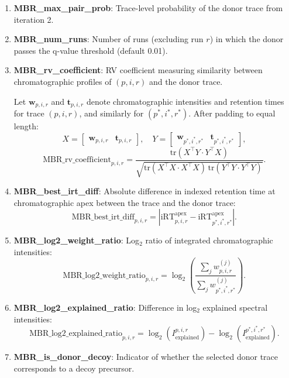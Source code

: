 \documentclass[pdflatex,sn-nature]{sn-jnl}
\begin{document}
\begin{enumerate}

\item \textbf{MBR\_max\_pair\_prob}:  
Trace-level probability of the donor trace from iteration 2.

\item \textbf{MBR\_num\_runs}:  
Number of runs (excluding run $r$) in which the donor passes the q-value threshold (default 0.01).

\item \textbf{MBR\_rv\_coefficient}:  
RV coefficient measuring similarity between chromatographic profiles of $(p,i,r)$ and the donor trace.  

Let $\mathbf{w}_{p,i,r}$ and $\mathbf{t}_{p,i,r}$ denote chromatographic intensities and retention times for trace $(p,i,r)$, and similarly for $(p^*,i^*,r^*)$. After padding to equal length:
\begin{equation}
X =
\begin{bmatrix}
\mathbf{w}_{p,i,r} & \mathbf{t}_{p,i,r}
\end{bmatrix},
\quad
Y =
\begin{bmatrix}
\mathbf{w}_{p^*,i^*,r^*} & \mathbf{t}_{p^*,i^*,r^*}
\end{bmatrix},
\end{equation}
\begin{equation}
\text{MBR\_rv\_coefficient}_{p,i,r} =
\frac{\mathrm{tr}(X^\top Y \cdot Y^\top X)}
{\sqrt{\mathrm{tr}(X^\top X \cdot X^\top X)\,
       \mathrm{tr}(Y^\top Y \cdot Y^\top Y)}}.
\end{equation}

\item \textbf{MBR\_best\_irt\_diff}:  
Absolute difference in indexed retention time at chromatographic apex between the trace and the donor trace:
\[
\text{MBR\_best\_irt\_diff}_{p,i,r} =
\left|
\text{iRT}_{p,i,r}^{\text{apex}} -
\text{iRT}_{p^*,i^*,r^*}^{\text{apex}}
\right|.
\]

\item \textbf{MBR\_log2\_weight\_ratio}:  
Log$_2$ ratio of integrated chromatographic intensities:
\[
\text{MBR\_log2\_weight\_ratio}_{p,i,r} =
\log_2\!\left(
\frac{\sum_j w_{p,i,r}^{(j)}}
     {\sum_j w_{p^*,i^*,r^*}^{(j)}}
\right).
\]

\item \textbf{MBR\_log2\_explained\_ratio}:  
Difference in log$_2$ explained spectral intensities:
\[
\text{MBR\_log2\_explained\_ratio}_{p,i,r} =
\log_2(I_{\text{explained}}^{p,i,r}) -
\log_2(I_{\text{explained}}^{p^*,i^*,r^*}).
\]

\item \textbf{MBR\_is\_donor\_decoy}:  
Indicator of whether the selected donor trace corresponds to a decoy precursor.

\end{enumerate}
\end{document}
